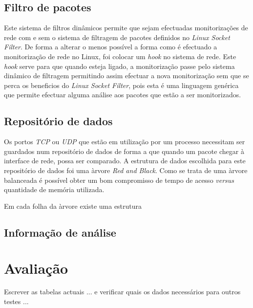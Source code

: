 \documentclass[a4paper]{llncs}
\begin{document}
\subsection*{Filtro de pacotes}
\label{sub:packet_filter}

Este sistema de filtros dinâmicos permite que sejam efectuadas monitorizações de rede com e sem o sistema de filtragem de pacotes definidos no \textit{Linux Socket Filter}. De forma a alterar o menos possível a forma como é efectuado a monitorização de rede no Linux, foi colocar um \textit{hook} no sistema de rede. Este \textit{hook} serve para que quando esteja ligado, a monitorização passe pelo sistema dinâmico de filtragem permitindo assim efectuar a nova monitorização sem que se perca os beneficios do \textit{Linux Socket Filter}, pois esta é uma linguagem genérica que permite efectuar alguma análise aos pacotes que estão a ser monitorizados.


\subsection*{Repositório de dados}
\label{sub:data_repository}

Os portos \textit{TCP} ou \textit{UDP} que estão em utilização por um processo necessitam ser guardados num repositório de dados de forma a que quando um pacote chegar à interface de rede, possa ser comparado. 
A estrutura de dados escolhida para este repositório de dados foi uma àrvore \textit{Red and Black}. Como se trata de uma àrvore balanceada é possível obter um bom compromisso de tempo de acesso \textit{versus} quantidade de memória utilizada.

Em cada folha da àrvore existe uma estrutura 

\subsection*{Informação de análise}
\label{sub:data_information}

\section{Avaliação}
\label{sec:evaluation}

Escrever as tabelas actuais ... e verificar quais os dados necessários para outros testes ...
\paragraph*{}
\end{document}
